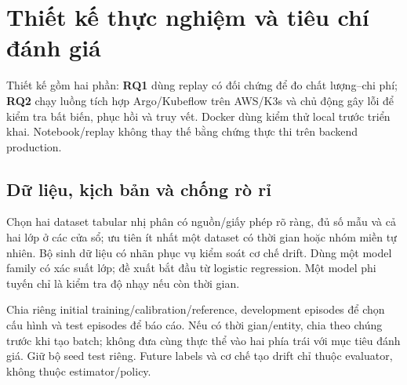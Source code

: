 \section{Thiết kế thực nghiệm và tiêu chí đánh giá}
Thiết kế gồm hai phần: \textbf{RQ1} dùng replay có đối chứng để đo chất lượng--chi phí; \textbf{RQ2} chạy luồng tích hợp Argo/Kubeflow trên AWS/K3s và chủ động gây lỗi để kiểm tra bất biến, phục hồi và truy vết. Docker dùng kiểm thử local trước triển khai. Notebook/replay không thay thế bằng chứng thực thi trên backend production.
\subsection{Dữ liệu, kịch bản và chống rò rỉ}
Chọn hai dataset tabular nhị phân có nguồn/giấy phép rõ ràng, đủ số mẫu và cả hai lớp ở các cửa sổ; ưu tiên ít nhất một dataset có thời gian hoặc nhóm miền tự nhiên. Bộ sinh dữ liệu có nhãn phục vụ kiểm soát cơ chế drift. Dùng một model family có xác suất lớp; đề xuất bắt đầu từ logistic regression. Một model phi tuyến chỉ là kiểm tra độ nhạy nếu còn thời gian.

Chia riêng initial training/calibration/reference, development episodes để chọn cấu hình và test episodes để báo cáo. Nếu có thời gian/entity, chia theo chúng trước khi tạo batch; không đưa cùng thực thể vào hai phía trái với mục tiêu đánh giá. Giữ bộ seed test riêng. Future labels và cơ chế tạo drift chỉ thuộc evaluator, không thuộc estimator/policy.

